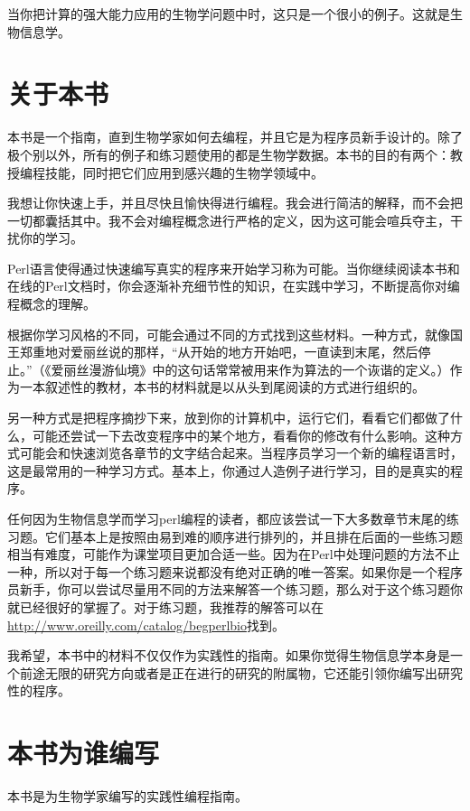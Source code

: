 当你把计算的强大能力应用的生物学问题中时，这只是一个很小的例子。这就是生物信息学。

\section*{关于本书}
本书是一个指南，直到生物学家如何去编程，并且它是为程序员新手设计的。除了极个别以外，所有的例子和练习题使用的都是生物学数据。本书的目的有两个：教授编程技能，同时把它们应用到感兴趣的生物学领域中。

我想让你快速上手，并且尽快且愉快得进行编程。我会进行简洁的解释，而不会把一切都囊括其中。我不会对编程概念进行严格的定义，因为这可能会喧兵夺主，干扰你的学习。

Perl语言使得通过快速编写真实的程序来开始学习称为可能。当你继续阅读本书和在线的Perl文档时，你会逐渐补充细节性的知识，在实践中学习，不断提高你对编程概念的理解。

根据你学习风格的不同，可能会通过不同的方式找到这些材料。一种方式，就像国王郑重地对爱丽丝说的那样，“从开始的地方开始吧，一直读到末尾，然后停止。”（《爱丽丝漫游仙境》中的这句话常常被用来作为算法的一个诙谐的定义。）作为一本叙述性的教材，本书的材料就是以从头到尾阅读的方式进行组织的。

另一种方式是把程序摘抄下来，放到你的计算机中，运行它们，看看它们都做了什么，可能还尝试一下去改变程序中的某个地方，看看你的修改有什么影响。这种方式可能会和快速浏览各章节的文字结合起来。当程序员学习一个新的编程语言时，这是最常用的一种学习方式。基本上，你通过人造例子进行学习，目的是真实的程序。

任何因为生物信息学而学习perl编程的读者，都应该尝试一下大多数章节末尾的练习题。它们基本上是按照由易到难的顺序进行排列的，并且排在后面的一些练习题相当有难度，可能作为课堂项目更加合适一些。因为在Perl中处理问题的方法不止一种，所以对于每一个练习题来说都没有绝对正确的唯一答案。如果你是一个程序员新手，你可以尝试尽量用不同的方法来解答一个练习题，那么对于这个练习题你就已经很好的掌握了。对于练习题，我推荐的解答可以在\href{http://www.oreilly.com/catalog/begperlbio}{http://www.oreilly.com/catalog/begperlbio}找到。

我希望，本书中的材料不仅仅作为实践性的指南。如果你觉得生物信息学本身是一个前途无限的研究方向或者是正在进行的研究的附属物，它还能引领你编写出研究性的程序。

\section*{本书为谁编写}
本书是为生物学家编写的实践性编程指南。

